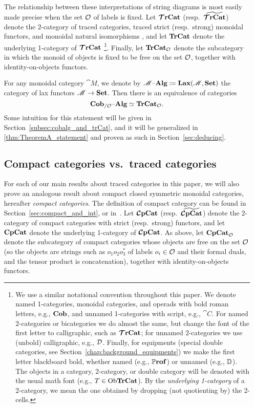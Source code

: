 \documentclass[11pt,oneside,article]{memoir}
\begin{document}
The relationship between these interpretations of string diagrams is most easily made precise when
the set $\mathcal{O}$ of labels is fixed. Let $\bm{\mathcal{T}}\mathbf{rCat}$ (resp.\ $\widetilde{\bm{\mathcal{T}}\mathbf{rCat}}$) denote the 2-category of
traced categories, traced strict (resp.\ strong) monoidal functors, and monoidal natural isomorphisms
\cite{HK}, and let $\mathbf{TrCat}$ denote the underlying 1-category of $\bm{\mathcal{T}}\mathbf{rCat}$%
\footnote{
   We use a similar notational convention throughout this paper. We denote named 1-categories,
   monoidal categories, and operads with bold roman letters, e.g., $\mathbf{Cob}$, and unnamed
   1-categories with script, e.g., $\cat{C}$. For named 2-categories or bicategories we do almost
   the same, but change the font of the first letter to calligraphic, such as $\bm{\mathcal{T}}\mathbf{rCat}$; for
   unnamed 2-categories we use (unbold) calligraphic, e.g., $\mathcal{D}$.  Finally, for equipments
   (special double categories, see Section~\ref{chap:background_equipments}) we make the first
   letter blackboard bold, whether named (e.g., $\mathbb{P}\mathbf{rof}$) or unnamed (e.g., $\mathbb{D}$). The
   objects in a category, 2-category, or double category will be denoted with the usual math font
   (e.g., $T\in\mathrm{Ob}\mathbf{TrCat}$). By the \emph{underlying 1-category} of a 2-category, we mean the one
   obtained by dropping (not quotienting by) the 2-cells.
}.
Finally, let $\mathbf{TrCat}_{\mathcal{O}}$ denote the subcategory in which the monoid of objects is fixed to be
free on the set $\mathcal{O}$, together with identity-on-objects functors.

For any monoidal category $\cat{M}$, we denote by $\mathscr{M}{\text \textendash}\mathbf{Alg}\coloneqq\mathbf{Lax}(\mathscr{M},\mathbf{Set})$ the
category of lax functors $\mathscr{M}\to\mathbf{Set}$. Then there is an equivalence of categories
\begin{equation}
      \label{eq:single_fiber_tr}
   \mathbf{Cob}_{/\mathcal{O}}{\text \textendash}\mathbf{Alg}\simeq\mathbf{TrCat}_{\mathcal{O}}.
\end{equation}
Some intuition for this statement will be given in Section~\ref{subsec:cobalg_and_trCat}, and it
will be generalized in \ref{thm:TheoremA_statement} and proven as such in Section~\ref{sec:deducing}.

\subsection{Compact categories vs.\ traced categories}

For each of our main results about traced categories in this paper, we will also prove an analogous
result about compact closed symmetric monoidal categories, hereafter \emph{compact categories}. The
definition of compact category can be found in Section~\ref{sec:compact_and_int}, or
in~\cite{MacL--CTWM}. Let $\bm{\mathcal{C}}\mathbf{pCat}$ (resp.\ $\widetilde{\bm{\mathcal{C}}\mathbf{pCat}}$) denote the 2-category of compact
categories with strict (resp.\ strong) functors, and let $\mathbf{CpCat}$ denote the underlying 1-category
of $\bm{\mathcal{C}}\mathbf{pCat}$. As above, let $\mathbf{CpCat}_{\mathcal{O}}$ denote the subcategory of compact categories
whose objects are free on the set $\mathcal{O}$ (so the objects are strings such as $o_1o_2o_3^*$ of
labels $o_i\in\mathcal{O}$ and their formal duals, and the tensor product is concatenation), together
with identity-on-objects functors.
\end{document}
